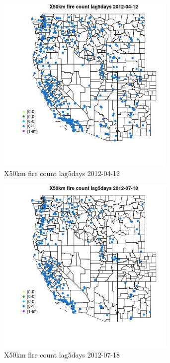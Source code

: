 \begin{figure} 
\centering  
\includegraphics[width=0.77\textwidth]{Code_Outputs/Report_ML_input_PM25_Step4_part_e_de_duplicated_aves_compiled_2019-05-14wNAs_MapObsX50km_fire_count_lag5days2012-04-12.jpg} 
\caption{\label{fig:Report_ML_input_PM25_Step4_part_e_de_duplicated_aves_compiled_2019-05-14wNAsMapObsX50km_fire_count_lag5days2012-04-12}X50km fire count lag5days 2012-04-12} 
\end{figure} 
 

\begin{figure} 
\centering  
\includegraphics[width=0.77\textwidth]{Code_Outputs/Report_ML_input_PM25_Step4_part_e_de_duplicated_aves_compiled_2019-05-14wNAs_MapObsX50km_fire_count_lag5days2012-07-18.jpg} 
\caption{\label{fig:Report_ML_input_PM25_Step4_part_e_de_duplicated_aves_compiled_2019-05-14wNAsMapObsX50km_fire_count_lag5days2012-07-18}X50km fire count lag5days 2012-07-18} 
\end{figure} 
 

